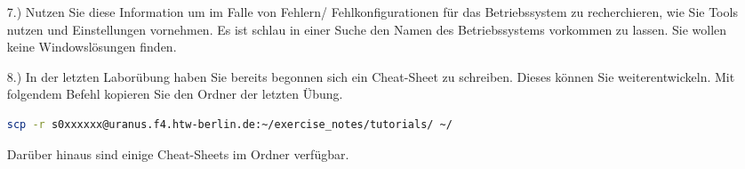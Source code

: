 \documentclass[paper=a4,fontsize=11pt]{scrartcl}%
\numberwithin{equation}{section}
\begin{document}
\begin{itemize}
	\item[7.)] Nutzen Sie diese Information um im Falle von Fehlern/ Fehlkonfigurationen für das Betriebssystem zu recherchieren, wie Sie Tools nutzen und Einstellungen vornehmen. Es ist schlau in einer Suche den Namen des Betriebssystems vorkommen zu lassen. Sie wollen keine Windowslösungen finden.
	\item[8.)] In der letzten Laborübung haben Sie bereits begonnen sich ein Cheat-Sheet zu schreiben. Dieses können Sie weiterentwickeln. Mit folgendem Befehl kopieren Sie den Ordner der letzten Übung. 
	\begin{lstlisting}[style=Bash, language=Bash]
scp -r s0xxxxxx@uranus.f4.htw-berlin.de:~/exercise_notes/tutorials/ ~/
		\end{lstlisting}
		Darüber hinaus sind einige Cheat-Sheets im Ordner  verfügbar.
\end{itemize}
\vskip0.5in
\end{document}
